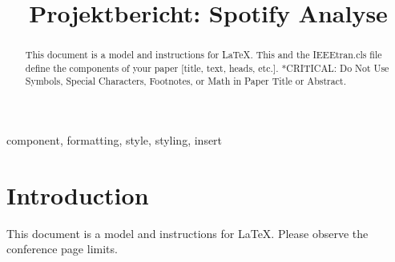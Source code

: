 \documentclass[conference]{IEEEtran}
\begin{document}
\title{Projektbericht: Spotify Analyse\\}

\author{
\and
{}
}

\maketitle

\begin{abstract}
This document is a model and instructions for \LaTeX.
This and the IEEEtran.cls file define the components of your paper [title, text, heads, etc.]. *CRITICAL: Do Not Use Symbols, Special Characters, Footnotes, 
or Math in Paper Title or Abstract.
\end{abstract}

\begin{IEEEkeywords}
component, formatting, style, styling, insert
\end{IEEEkeywords}

\section{Introduction}
This document is a model and instructions for \LaTeX.
Please observe the conference page limits. 
\end{document}

